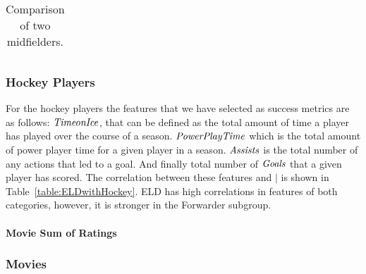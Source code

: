 {\begin{table}[htbp]
{\begin{tabular}{|l|l|c|c|c|c|c|c|c|}
				\end{tabular}}
				\caption{Comparison of two midfielders.\label{table:MidfielderComparison}}
			\end{table}

	
	
						
						\begin{table}
						
						
							\centering
									\caption{Correlation between $\mid$ metric and success metrics of NHL Players.	\label{table:ELDwithHockey}}
							\end{table}
	\subsubsection{Hockey Players}
	For the hockey players the features that we have selected as success metrics are as follows: $\it{Time on Ice}$, that can be defined as the total amount of time a player has played over the course of a season. $\it{Power Play Time}$ which is the total amount of power player time for a given player in a season. $\it{Assists}$ is the total number of any actions that led to a goal. And finally total number of $\it{Goals}$ that a given player has scored.
The correlation between these features and $\mid$ is shown in Table~\ref{table:ELDwithHockey}. ELD has high correlations in features of both categories, however, it is stronger in the Forwarder subgroup.
		\paragraph{Movie Sum of Ratings}
	\subsubsection{Movies} 
	
}
